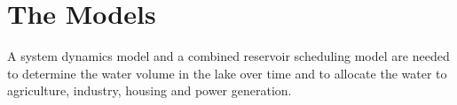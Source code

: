 \section{The Models}
A system dynamics model and a combined reservoir scheduling model are needed to determine the water volume in the lake over time and to allocate the water to agriculture, industry, housing and power generation.

